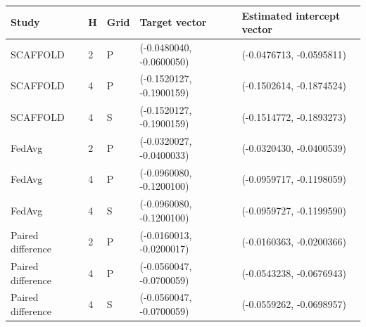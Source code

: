 \begin{tabular}{lllll}
Study & H & Grid & Target vector & Estimated intercept vector \\
\hline
SCAFFOLD & 2 & P & (-0.0480040, -0.0600050) & (-0.0476713, -0.0595811) \\
SCAFFOLD & 4 & P & (-0.1520127, -0.1900159) & (-0.1502614, -0.1874524) \\
SCAFFOLD & 4 & S & (-0.1520127, -0.1900159) & (-0.1514772, -0.1893273) \\
FedAvg & 2 & P & (-0.0320027, -0.0400033) & (-0.0320430, -0.0400539) \\
FedAvg & 4 & P & (-0.0960080, -0.1200100) & (-0.0959717, -0.1198059) \\
FedAvg & 4 & S & (-0.0960080, -0.1200100) & (-0.0959727, -0.1199590) \\
Paired difference & 2 & P & (-0.0160013, -0.0200017) & (-0.0160363, -0.0200366) \\
Paired difference & 4 & P & (-0.0560047, -0.0700059) & (-0.0543238, -0.0676943) \\
Paired difference & 4 & S & (-0.0560047, -0.0700059) & (-0.0559262, -0.0698957) \\
\end{tabular}
